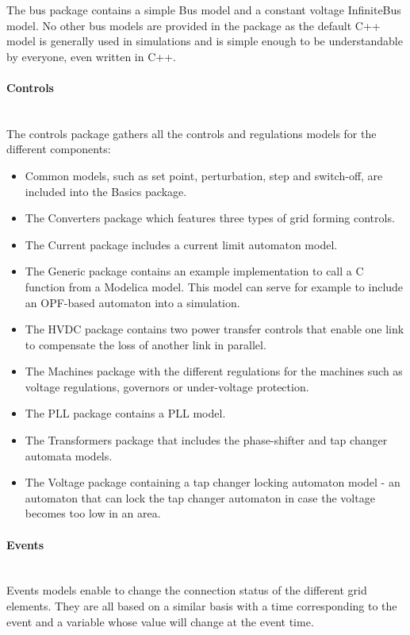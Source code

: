 \documentclass[a4paper, 12pt]{report}
\begin{document}
The bus package contains a simple Bus model and a constant voltage InfiniteBus model. No other bus models are provided in the package as the default C++ model is generally used in \Dynawo simulations and is simple enough to be understandable by everyone, even written in C++.

\paragraph{Controls}
~~\\

The controls package gathers all the controls and regulations models for the different components:
\begin{itemize}
\item Common models, such as set point, perturbation, step and switch-off, are included into the Basics package.
\item The Converters package which features three types of grid forming controls.
\item The Current package includes a current limit automaton model.
\item The Generic package contains an example implementation to call a C function from a Modelica model. This model can serve for example to include an OPF-based automaton into a \Dynawo simulation.
\item The HVDC package contains two power transfer controls that enable one link to compensate the loss of another link in parallel.
\item The Machines package with the different regulations for the machines such as voltage  regulations, governors or under-voltage protection.
\item The \ac{PLL} package contains a \ac{PLL} model.
\item The Transformers package that includes the phase-shifter and tap changer automata models.
\item The Voltage package containing a tap changer locking automaton model - an automaton that can lock the tap changer automaton in case the voltage becomes too low in an area.
\end{itemize}

\paragraph{Events}
~~\\

Events models enable to change the connection status of the different grid elements. They are all based on a similar basis with a time corresponding to the event and a variable whose value will change at the event time.
\end{document}
